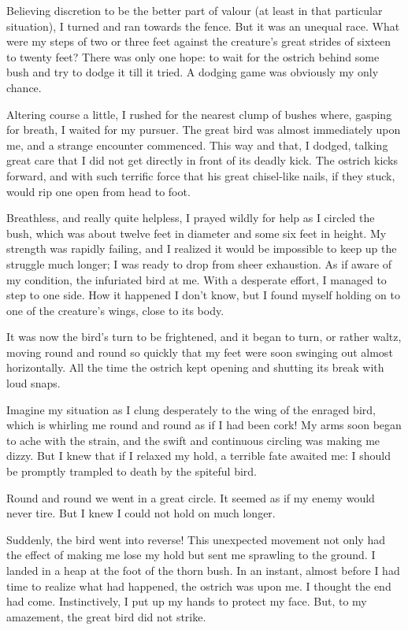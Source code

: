 \par
Believing discretion to be the better part of valour (at least in that particular situation), I turned and ran towards the fence. But it was an unequal race. What were my steps of two or three feet against the creature's great strides of sixteen to twenty feet? There was only one hope: to wait for the ostrich behind some bush and try to dodge it till it tried. A dodging game was obviously my only chance.
\par
Altering course a little, I rushed for the nearest clump of bushes where, gasping for breath, I waited for my pursuer. The great bird was almost immediately upon me, and a strange encounter commenced. This way and that, I dodged, talking great care that I did not get directly in front of its deadly kick. The ostrich kicks forward, and with such terrific force that his great chisel-like nails, if they stuck, would rip one open from head to foot.
\par
Breathless, and really quite helpless, I prayed wildly for help as I circled the bush, which was about twelve feet in diameter and some six feet in height. My strength was rapidly failing, and I realized it would be impossible to keep up the struggle much longer; I was ready to drop from sheer exhaustion. As if aware of my condition, the infuriated bird at me. With a desperate effort, I managed to step to one side. How it happened I don't know, but I found myself holding on to one of the creature's wings, close to its body.
\par
It was now the bird's turn to be frightened, and it began to turn, or rather waltz, moving round and round so quickly that my feet were soon swinging out almost horizontally. All the time the ostrich kept opening and shutting its break with loud snaps.
\par
Imagine my situation as I clung desperately to the wing of the enraged bird, which is whirling me round and round as if I had been cork! My arms soon began to ache with the strain, and the swift and continuous circling was making me dizzy. But I knew that if I relaxed my hold, a terrible fate awaited me: I should be promptly trampled to death by the spiteful bird.
\par
Round and round we went in a great circle. It seemed as if my enemy would never tire. But I knew I could not hold on much longer.
\par
Suddenly, the bird went into reverse! This unexpected movement not only had the effect of making me lose my hold but sent me sprawling to the ground. I landed in a heap at the foot of the thorn bush. In an instant, almost before I had time to realize what had happened, the ostrich was upon me. I thought the end had come. Instinctively, I put up my hands to protect my face. But, to my amazement, the great bird did not strike.
